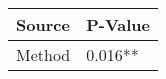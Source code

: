 
\centering
\begin{tabular}{ll}
\toprule
Source & P-Value \\
\midrule
Method & 0.016** \\
\bottomrule
\end{tabular}
